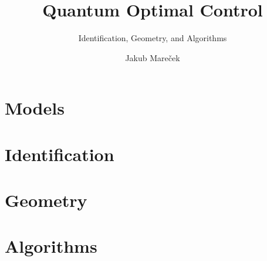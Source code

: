 \documentclass[graybox,envcountchap,sectrefs]{svmono}
\def\biblio{}
\begin{document}
\def\biblio{}
\providecommand{\bbletal}{et al.}

\author{Jakub Mare{\v c}ek}
\title{Quantum Optimal Control}
\subtitle{Identification, Geometry, and Algorithms}
\maketitle

\frontmatter%

\tableofcontents

\mainmatter%
\part{Models}





\part{Identification}





\part{Geometry}






\part{Algorithms}





\backmatter%


\printindex
\end{document}
